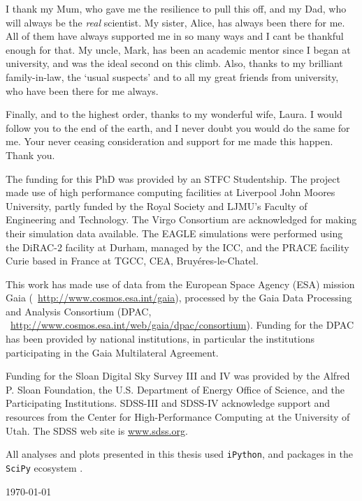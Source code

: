 I thank my Mum, who gave me the resilience to pull this off, and my Dad, who will always be the \emph{real} scientist. My sister, Alice, has always been there for me. All of them have always supported me in so many ways and I cant be thankful enough for that. My uncle, Mark, has been an academic mentor since I began at university, and was the ideal second on this climb. Also, thanks to my brilliant family-in-law, the `usual suspects' and to all my great friends from university, who have been there for me always. 

Finally, and to the highest order, thanks to my wonderful wife, Laura. I would follow you to the end of the earth, and I never doubt you would do the same for me. Your never ceasing consideration and support for me made this happen. Thank you.

\newpage

The funding for this PhD was provided by an STFC Studentship. The project made use of high performance computing facilities at Liverpool John Moores University, partly funded by the Royal Society and LJMU’s Faculty of Engineering and Technology. The Virgo Consortium are acknowledged for making their simulation data available. The EAGLE simulations were performed using the DiRAC-2 facility at Durham, managed by the ICC, and the PRACE facility Curie based in France at TGCC, CEA, Bruy\'eres-le-Chatel.

This work has made use of data from the European Space Agency (ESA)
mission Gaia (~\url{http://www.cosmos.esa.int/gaia}), processed by
the Gaia Data Processing and Analysis Consortium (DPAC,
~\url{http://www.cosmos.esa.int/web/gaia/dpac/consortium}). Funding
for the DPAC has been provided by national institutions, in particular
the institutions participating in the Gaia Multilateral Agreement.

Funding for the Sloan Digital Sky Survey III and IV was provided by the Alfred P. Sloan Foundation, the U.S. Department of Energy Office of Science, and the Participating Institutions. SDSS-III and SDSS-IV acknowledge
support and resources from the Center for High-Performance Computing at
the University of Utah. The SDSS web site is \url{www.sdss.org}.

All analyses and plots presented in this thesis used \texttt{iPython}, and packages in the \texttt{SciPy} ecosystem \citep{Jones:2001aa,4160265,4160251,5725236}.


\vfill
{\sc \AuthorName \hfill\today}